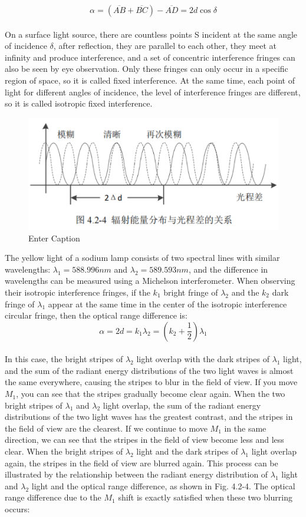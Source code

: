 \documentclass[UTF8]{article}
\begin{document}
\[ \alpha =(\overline{AB}+\overline{BC} )-\overline{AD}=2d\cos\delta \] \\

On a surface light source, there are countless points S incident at the same angle of incidence $\delta$, after reflection, they are parallel to each other, they meet at infinity and produce interference, and a set of concentric interference fringes can also be seen by eye observation. Only these fringes can only occur in a specific region of space, so it is called fixed interference. At the same time, each point of light for different angles of incidence, the level of interference fringes are different, so it is called isotropic fixed interference.

\begin{figure}
    \centering
    \includegraphics[width=0.5\linewidth]{FIG6.png}
    \caption{Enter Caption}
\end{figure}

The yellow light of a sodium lamp consists of two spectral lines with similar wavelengths: $\lambda_1=588.996nm$ and $\lambda_2=589.593nm$, and the difference in wavelengths can be measured using a Michelson interferometer. When observing their isotropic interference fringes, if the $k_1$ bright fringe of $\lambda_2$ and the $k_2$ dark fringe of $\lambda_1$ appear at the same time in the center of the isotropic interference circular fringe, then the optical range difference is:\\

\[\alpha =2d=k_{1}\lambda _{2} = (k_{2}+\frac{1}{2}  )\lambda _{1} \]\\

In this case, the bright stripes of $\lambda_2$ light overlap with the dark stripes of $\lambda_1$ light, and the sum of the radiant energy distributions of the two light waves is almost the same everywhere, causing the stripes to blur in the field of view. If you move $M_1$, you can see that the stripes gradually become clear again. When the two bright stripes of $\lambda_1$ and $\lambda_2$ light overlap, the sum of the radiant energy distributions of the two light waves has the greatest contrast, and the stripes in the field of view are the clearest. If we continue to move $M_1$ in the same direction, we can see that the stripes in the field of view become less and less clear. When the bright stripes of $\lambda_2$ light and the dark stripes of $\lambda_1$ light overlap again, the stripes in the field of view are blurred again. This process can be illustrated by the relationship between the radiant energy distribution of $\lambda_1$ light and $\lambda_2$ light and the optical range difference, as shown in Fig. 4.2-4. The optical range difference due to the $M_1$ shift is exactly satisfied when these two blurring occurs:\\
\end{document}
